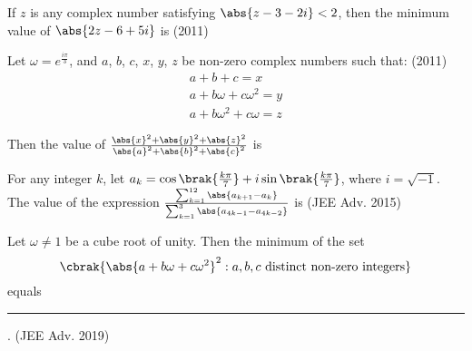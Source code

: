 \iffalse
\title{Assignment 1}
\author{AI24BTECH11031 - Shivram S}
\section{integer}
\fi

	\item If $z$ is any complex number satisfying $\abs{z - 3 - 2i} < 2$, then the
		minimum value of $\abs{2z - 6 + 5i}$ is
		\hfill (2011)

	\item Let $\omega = e^{\frac{i\pi}3}$, and $a$, $b$, $c$, $x$, $y$, $z$ be non-zero complex numbers such that:
		\hfill (2011)
		\begin{gather*}
			a + b + c = x \\
			a + b\omega + c\omega^2 = y \\
			a + b\omega^2 + c\omega = z 
		\end{gather*}

		Then the value of $\frac {\abs{x}^2 + \abs{y}^2 + \abs{z}^2} {\abs{a}^2 + \abs{b}^2 + \abs{c}^2}$ is

	\item For any integer $k$, let $a_k = \cos\brak{\frac{k\pi}{7}} + i\sin\brak{\frac{k\pi}{7}}$, where	
		$i = \sqrt{-1}$. The value of the expression $\frac {\sum_{k=1}^{12} \abs{a_{k+1} - a_k}} {\sum_{k=1}^{3} \abs{a_{4k-1} - a_{4k-2}}}$ is
		\hfill (JEE Adv. 2015)

	\item Let $\omega \ne 1$ be a cube root of unity. Then the minimum of the set 
        $$\cbrak{\abs{a + b\omega + c\omega^2}^2: a,b,c \text{ distinct non-zero integers}}$$
        equals \rule{1cm}{0.15mm}.
		\hfill (JEE Adv. 2019)

